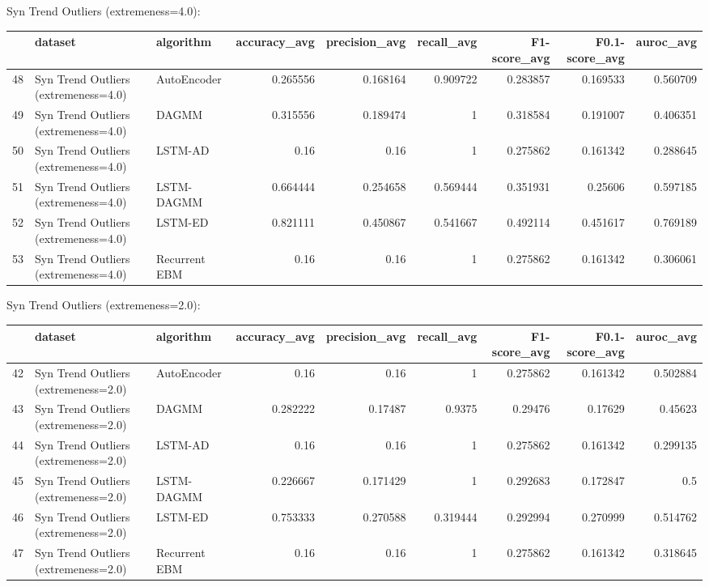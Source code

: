 Syn Trend Outliers (extremeness=4.0):

\begin{tabular}{rllrrrrrr}
\hline
    & dataset                              & algorithm     &   accuracy\_avg &   precision\_avg &   recall\_avg &   F1-score\_avg &   F0.1-score\_avg &   auroc\_avg \\
\hline
 48 & Syn Trend Outliers (extremeness=4.0) & AutoEncoder   &       0.265556 &        0.168164 &     0.909722 &       0.283857 &         0.169533 &    0.560709 \\
 49 & Syn Trend Outliers (extremeness=4.0) & DAGMM         &       0.315556 &        0.189474 &     1        &       0.318584 &         0.191007 &    0.406351 \\
 50 & Syn Trend Outliers (extremeness=4.0) & LSTM-AD       &       0.16     &        0.16     &     1        &       0.275862 &         0.161342 &    0.288645 \\
 51 & Syn Trend Outliers (extremeness=4.0) & LSTM-DAGMM    &       0.664444 &        0.254658 &     0.569444 &       0.351931 &         0.25606  &    0.597185 \\
 52 & Syn Trend Outliers (extremeness=4.0) & LSTM-ED       &       0.821111 &        0.450867 &     0.541667 &       0.492114 &         0.451617 &    0.769189 \\
 53 & Syn Trend Outliers (extremeness=4.0) & Recurrent EBM &       0.16     &        0.16     &     1        &       0.275862 &         0.161342 &    0.306061 \\
\hline
\end{tabular}

Syn Trend Outliers (extremeness=2.0):

\begin{tabular}{rllrrrrrr}
\hline
    & dataset                              & algorithm     &   accuracy\_avg &   precision\_avg &   recall\_avg &   F1-score\_avg &   F0.1-score\_avg &   auroc\_avg \\
\hline
 42 & Syn Trend Outliers (extremeness=2.0) & AutoEncoder   &       0.16     &        0.16     &     1        &       0.275862 &         0.161342 &    0.502884 \\
 43 & Syn Trend Outliers (extremeness=2.0) & DAGMM         &       0.282222 &        0.17487  &     0.9375   &       0.29476  &         0.17629  &    0.45623  \\
 44 & Syn Trend Outliers (extremeness=2.0) & LSTM-AD       &       0.16     &        0.16     &     1        &       0.275862 &         0.161342 &    0.299135 \\
 45 & Syn Trend Outliers (extremeness=2.0) & LSTM-DAGMM    &       0.226667 &        0.171429 &     1        &       0.292683 &         0.172847 &    0.5      \\
 46 & Syn Trend Outliers (extremeness=2.0) & LSTM-ED       &       0.753333 &        0.270588 &     0.319444 &       0.292994 &         0.270999 &    0.514762 \\
 47 & Syn Trend Outliers (extremeness=2.0) & Recurrent EBM &       0.16     &        0.16     &     1        &       0.275862 &         0.161342 &    0.318645 \\
\hline
\end{tabular}

